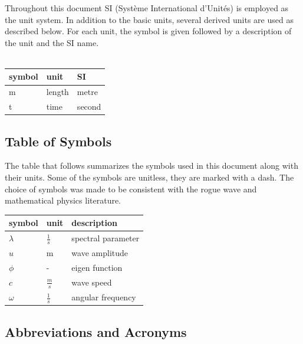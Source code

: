 \documentclass[12pt]{article}
\begin{document}
Throughout this document SI (Syst\`{e}me International d'Unit\'{e}s) is employed
as the unit system.  In addition to the basic units, several derived units are
used as described below.  For each unit, the symbol is given followed by a
description of the unit and the SI name. \\

~\newline

\renewcommand{\arraystretch}{1.2}
  \noindent \begin{tabular}{l l l} 
    \toprule		
    \textbf{symbol} & \textbf{unit} & \textbf{SI}\\
    \midrule 
    \si{\metre} & length & metre\\
    t & time & second\\
    \bottomrule
  \end{tabular}


\subsection{Table of Symbols}

The table that follows summarizes the symbols used in this document along with
their units. Some of the symbols are unitless, 
they are marked with a dash. The choice of symbols was made to be consistent 
with the rogue 
wave and mathematical physics literature.  

\renewcommand{\arraystretch}{1.2}
\noindent \begin{longtable*}{l l p{12cm}} \toprule
\textbf{symbol} & \textbf{unit} & \textbf{description}\\
\midrule 
$\lambda$ & $\frac{1}{s}$ & spectral parameter
\\
$u$ & m & wave amplitude 
\\  
$\phi$ & - & eigen function
\\ 
$c$ & $\frac{m}{s}$ & wave speed 
\\
$\omega$ & $\frac{1}{s}$ & angular frequency 
\\ 
\bottomrule
\end{longtable*}

\subsection{Abbreviations and Acronyms}
\end{document}
